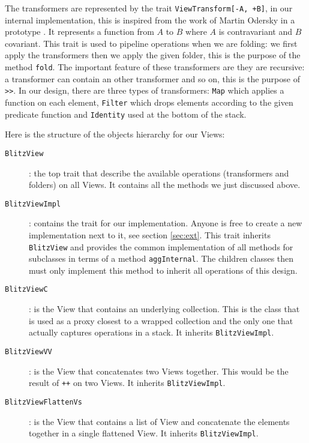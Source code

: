 \documentclass[a4paper,12pt,twocolumn]{article}
\begin{document}
The transformers are represented by the trait \verb|ViewTransform[-A, +B]|, in our internal implementation, this is inspired from the work of Martin Odersky in a prototype \cite{martin-view-prototype}. %
It represents a function from $A$ to $B$ where $A$ is contravariant and $B$ covariant.
This trait is used to pipeline operations when we are folding: we first apply the transformers then we apply the given folder, this is the purpose of the method \verb|fold|.
The important feature of these transformers are they are recursive: a transformer can contain an other transformer and so on, this is the purpose of \verb|>>|.
In our design, there are three types of transformers: \verb|Map| which applies a function on each element, \verb|Filter| which drops elements according to the given predicate function and \verb|Identity| used at the bottom of the stack.

Here is the structure of the objects hierarchy for our Views:
\begin{description}
    \item[{\tt BlitzView}]: the top trait that describe the available operations (transformers and folders) on all Views.
        It contains all the methods we just discussed above.
    \item[{\tt BlitzViewImpl}]: contains the trait for our implementation.
        Anyone is free to create a new implementation next to it, see section \ref{sec:ext}.
        This trait inherits \verb|BlitzView| and provides the common implementation of all methods for subclasses in terms of a method \verb|aggInternal|.
        The children classes then must only implement this method to inherit all operations of this design.
    \item[{\tt BlitzViewC}]: is the View that contains an underlying collection.
        This is the class that is used as a proxy closest to a wrapped collection and the only one that actually captures operations in a stack.
        It inherits \verb|BlitzViewImpl|.
    \item[{\tt BlitzViewVV}]: is the View that concatenates two Views together.
        This would be the result of \verb|++| on two Views.
        It inherits \verb|BlitzViewImpl|.
    \item[{\tt BlitzViewFlattenVs}]: is the View that contains a list of View and concatenate the elements together in a single flattened View.
        It inherits \verb|BlitzViewImpl|.
\end{description}
\end{document}
